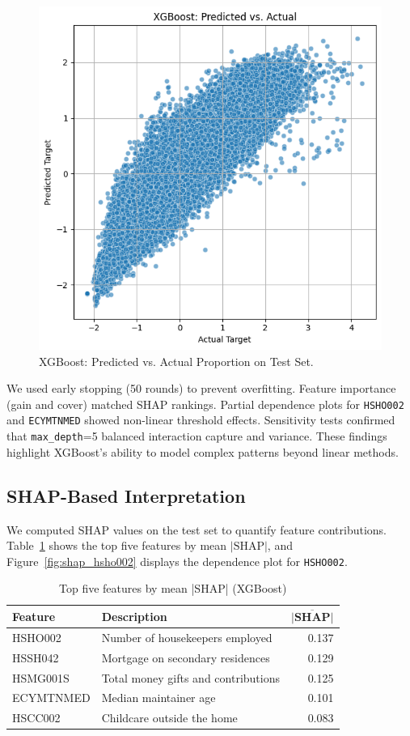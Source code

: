 \documentclass{article}
\begin{document}
\begin{figure}[ht]
  \centering
  \includegraphics[width=0.75\linewidth]{figures/xgb_scatter.png}
  \caption{XGBoost: Predicted vs. Actual Proportion on Test Set.}
  \label{fig:xgb_scatter}
\end{figure}

We used early stopping (50 rounds) to prevent overfitting. Feature importance (gain and cover) matched SHAP rankings. Partial dependence plots for \texttt{HSHO002} and \texttt{ECYMTNMED} showed non-linear threshold effects. Sensitivity tests confirmed that \texttt{max\_depth}=5 balanced interaction capture and variance. These findings highlight XGBoost’s ability to model complex patterns beyond linear methods.

\subsection{SHAP-Based Interpretation}
We computed SHAP values on the test set to quantify feature contributions. Table~\ref{tab:shap_top5} shows the top five features by mean $\left|\text{SHAP}\right|$, and Figure~\ref{fig:shap_hsho002} displays the dependence plot for \texttt{HSHO002}.

\begin{table}[ht]
  \centering
  \caption{Top five features by mean |SHAP| (XGBoost)}
  \begin{tabular}{llr}
    \toprule
    \textbf{Feature} & \textbf{Description}                       & $\mathbf{\overline{\lvert\text{SHAP}\rvert}}$ \\
    \midrule
    HSHO002  & Number of housekeepers employed            & 0.137 \\
    HSSH042  & Mortgage on secondary residences           & 0.129 \\
    HSMG001S & Total money gifts and contributions        & 0.125 \\
    ECYMTNMED& Median maintainer age                     & 0.101 \\
    HSCC002  & Childcare outside the home                 & 0.083 \\
    \bottomrule
  \end{tabular}
  \label{tab:shap_top5}
\end{table}
\end{document}
